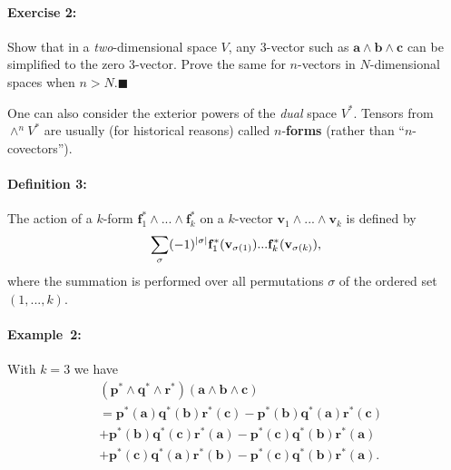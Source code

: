 \paragraph{Exercise 2:}

Show that in a \emph{two}-dimensional space $V$, any 3-vector such
as $\mathbf{a}\wedge\mathbf{b}\wedge\mathbf{c}$ can be simplified
to the zero 3-vector. Prove the same for $n$-vectors in $N$-dimensional
spaces when $n>N$.\hfill{}$\blacksquare$

One can also consider the exterior powers of the \emph{dual} space
$V^{*}$. Tensors from $\wedge^{n}V^{*}$ are usually (for historical
reasons) called $n$-\textbf{forms} (rather than
{}``$n$-covectors'').



\paragraph{Definition 3:}

The action of a $k$-form $\mathbf{f}_{1}^{*}\wedge...\wedge\mathbf{f}_{k}^{*}$
on a $k$-vector $\mathbf{v}_{1}\wedge...\wedge\mathbf{v}_{k}$ is
defined by\[
\displaystyle\sum_{\sigma}(-1)^{\left|\sigma\right|}\mathbf{f}_{1}^{*}(\mathbf{v}_{\sigma(1)})...\mathbf{f}_{k}^{*}(\mathbf{v}_{\sigma(k)}),\]
where the summation is performed over all permutations $\sigma$ of
the ordered set $\left(1,...,k\right)$.


\paragraph{Example~2:}

With $k=3$ we have\begin{align*}
 & (\mathbf{p}^{*}\wedge\mathbf{q}^{*}\wedge\mathbf{r}^{*})(\mathbf{a}\wedge\mathbf{b}\wedge\mathbf{c})\\
 & =\mathbf{p}^{*}(\mathbf{a})\mathbf{q}^{*}(\mathbf{b})\mathbf{r}^{*}(\mathbf{c})-\mathbf{p}^{*}(\mathbf{b})\mathbf{q}^{*}(\mathbf{a})\mathbf{r}^{*}(\mathbf{c})\\
 & +\mathbf{p}^{*}(\mathbf{b})\mathbf{q}^{*}(\mathbf{c})\mathbf{r}^{*}(\mathbf{a})-\mathbf{p}^{*}(\mathbf{c})\mathbf{q}^{*}(\mathbf{b})\mathbf{r}^{*}(\mathbf{a})\\
 & +\mathbf{p}^{*}(\mathbf{c})\mathbf{q}^{*}(\mathbf{a})\mathbf{r}^{*}(\mathbf{b})-\mathbf{p}^{*}(\mathbf{c})\mathbf{q}^{*}(\mathbf{b})\mathbf{r}^{*}(\mathbf{a}).\end{align*}



